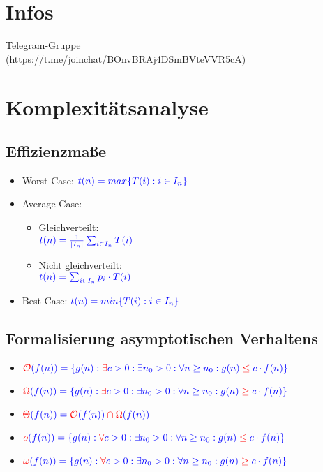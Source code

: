\documentclass[12pt,a4paper]{article}
\author{Jonas Schulz}
\begin{document}
\section*{Infos}
\hyperlink{https://t.me/joinchat/BOnvBRAj4DSmBVteVVR5cA}{Telegram-Gruppe} \\(https://t.me/joinchat/BOnvBRAj4DSmBVteVVR5cA)
\section{Komplexitätsanalyse}
\subsection{Effizienzmaße}
\begin{itemize}
\item Worst Case: $\color{blue}t(n)=max\{T(i):i\in I_n\}$
\item Average Case: \begin{itemize}
\item Gleichverteilt:\\
$\color{blue}t(n)=\frac{1}{\vert I_n \vert}\sum_{i\in I_n}T(i)$
\item Nicht gleichverteilt:\\
$\color{blue}t(n)=\sum_{i\in I_n}p_i\cdot T(i)$
\end{itemize}
\item Best Case: $\color{blue}t(n)=min\{T(i):i\in I_n\}$
\end{itemize}
\subsection{Formalisierung asymptotischen Verhaltens}
\begin{itemize}
\item $\color{red}\mathcal{O}\color{blue}(f(n)) = \{ g(n):\color{red}\exists\color{blue} c>0: \exists n_0>0: \forall n\geq n_0: g(n)\color{red}\leq\color{blue} c\cdot f(n)\}$
\item $\color{red}\Omega\color{blue}(f(n)) = \{ g(n):\color{red}\exists\color{blue} c>0: \exists n_0>0: \forall n\geq n_0: g(n)\color{red}\geq\color{blue} c\cdot f(n)\}$
\item $\color{red}\Theta \color{blue}(f(n)) = \color{red}\mathcal{O}\color{blue}(f(n)) \color{red}\cap\Omega \color{blue}(f(n))$
\item $\color{red}o\color{blue}(f(n)) = \{ g(n):\color{red}\forall\color{blue} c>0: \exists n_0>0: \forall n\geq n_0: g(n)\color{red}\leq\color{blue} c\cdot f(n)\}$
\item $\color{red}\omega\color{blue}(f(n)) = \{ g(n):\color{red}\forall\color{blue} c>0: \exists n_0>0: \forall n\geq n_0: g(n)\color{red}\geq\color{blue} c\cdot f(n)\}$
\end{itemize}
\end{document}
